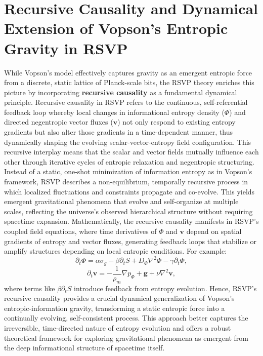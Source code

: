 \documentclass[11pt]{article}
\theoremstyle{plain}
\theoremstyle{definition}
\begin{document}
\section{Recursive Causality and Dynamical Extension of Vopson's Entropic Gravity in RSVP}
While Vopson's model effectively captures gravity as an emergent entropic force from a discrete, static lattice of Planck-scale bits, the RSVP theory enriches this picture by incorporating \textbf{recursive causality} as a fundamental dynamical principle. Recursive causality in RSVP refers to the continuous, self-referential feedback loop whereby local changes in informational entropy density ($\Phi$) and directed negentropic vector fluxes ($\mathbf{v}$) not only respond to existing entropy gradients but also alter those gradients in a time-dependent manner, thus dynamically shaping the evolving scalar-vector-entropy field configuration.
This recursive interplay means that the scalar and vector fields mutually influence each other through iterative cycles of entropic relaxation and negentropic structuring. Instead of a static, one-shot minimization of information entropy as in Vopson's framework, RSVP describes a non-equilibrium, temporally recursive process in which localized fluctuations and constraints propagate and co-evolve. This yields emergent gravitational phenomena that evolve and self-organize at multiple scales, reflecting the universe's observed hierarchical structure without requiring spacetime expansion.
Mathematically, the recursive causality manifests in RSVP's coupled field equations, where time derivatives of $\Phi$ and $\mathbf{v}$ depend on spatial gradients of entropy and vector fluxes, generating feedback loops that stabilize or amplify structures depending on local entropic conditions. For example:
\begin{equation}
\partial_t \Phi = \alpha \sigma_g - \beta \partial_t S + D_\Phi \nabla^2 \Phi - \gamma \partial_t \Phi,
\label{eq:phi_recursive}
\end{equation}
\begin{equation}
\partial_t \bm{v} = -\frac{1}{\rho_m} \nabla p_\Phi + \bm{g} + \nu \nabla^2 \bm{v},
\label{eq:v_recursive}
\end{equation}
where terms like $\beta \partial_t S$ introduce feedback from entropy evolution. Hence, RSVP's recursive causality provides a crucial dynamical generalization of Vopson's entropic-information gravity, transforming a static entropic force into a continually evolving, self-consistent process. This approach better captures the irreversible, time-directed nature of entropy evolution and offers a robust theoretical framework for exploring gravitational phenomena as emergent from the deep informational structure of spacetime itself.
\end{document}
